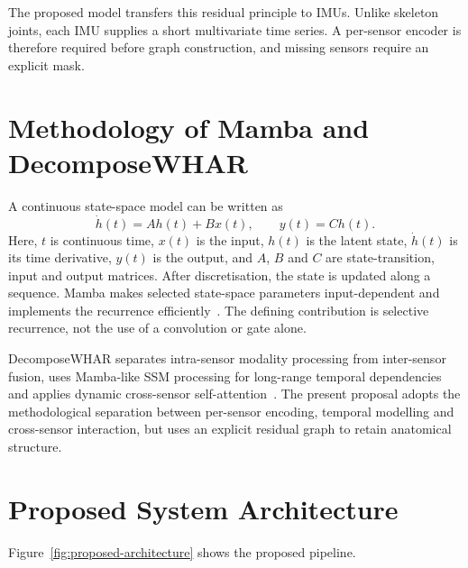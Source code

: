 \documentclass[12pt,a4paper,twoside,openright]{report}
\begin{document}
The proposed model transfers this residual principle to IMUs. Unlike skeleton joints, each IMU supplies a short multivariate time series. A per-sensor encoder is therefore required before graph construction, and missing sensors require an explicit mask.

\section[Methodology of Mamba and DecomposeWHAR]{Methodology of Mamba and\\DecomposeWHAR}
A continuous state-space model can be written as
\[
\dot h(t)=Ah(t)+Bx(t),\qquad y(t)=Ch(t).
\]
Here, $t$ is continuous time, $x(t)$ is the input, $h(t)$ is the latent state, $\dot h(t)$ is its time derivative, $y(t)$ is the output, and $A$, $B$ and $C$ are state-transition, input and output matrices. After discretisation, the state is updated along a sequence. Mamba makes selected state-space parameters input-dependent and implements the recurrence efficiently~\cite{mamba}. The defining contribution is selective recurrence, not the use of a convolution or gate alone.

DecomposeWHAR separates intra-sensor modality processing from inter-sensor fusion, uses Mamba-like SSM processing for long-range temporal dependencies and applies dynamic cross-sensor self-attention~\cite{decompose}. The present proposal adopts the methodological separation between per-sensor encoding, temporal modelling and cross-sensor interaction, but uses an explicit residual graph to retain anatomical structure.

\section{Proposed System Architecture}
Figure~\ref{fig:proposed-architecture} shows the proposed pipeline.
\end{document}
